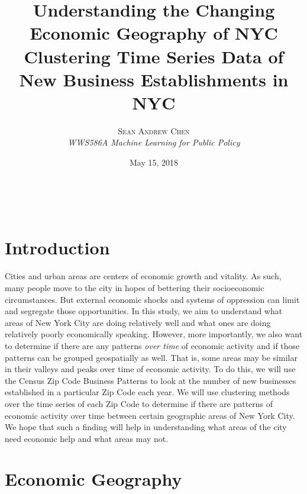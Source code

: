 \documentclass[letter, 11pt]{article} %
\title{\textbf{Understanding the Changing Economic Geography of NYC}\\ %
Clustering Time Series Data of New Business Establishments in NYC} %
\author{\textsc{Sean Andrew Chen} %
\\{\textit{WWS586A Machine Learning for Public Policy}}} %
\date{May 15, 2018} %
\makeatletter
\renewcommand{\maketitle}{ %
\begin{flushright} %
{\large\@title} %

\vspace{350pt} %

{\large\@author} %
\\\@date %

\vspace{40pt} %
\end{flushright}
}
\makeatother
\begin{document}

\begin{titlepage}
	\maketitle %
	\thispagestyle{empty}
\end{titlepage}

\pagebreak

\tableofcontents

\pagebreak



\section{Introduction}
Cities and urban areas are centers of economic growth and vitality. As such, many people move to the city in hopes of bettering their socioeconomic circumstances. But external economic shocks and systems of oppression can limit and segregate those opportunities. In this study, we aim to understand what areas of New York City are doing relatively well and what ones are doing relatively poorly economically speaking. However, more importantly, we also want to determine if there are any patterns \textit{over time} of economic activity and if those patterns can be grouped geospatially as well. That is, some areas may be similar in their valleys and peaks over time of economic activity. To do this, we will use the Census Zip Code Business Patterns to look at the number of new businesses established in a particular Zip Code each year. We will use clustering methods over the time series of each Zip Code to determine if there are patterns of economic activity over time between certain geographic areas of New York City. We hope that such a finding will help in understanding what areas of the city need economic help and what areas may not. 

\pagebreak


\section{Economic Geography}
\end{document}
